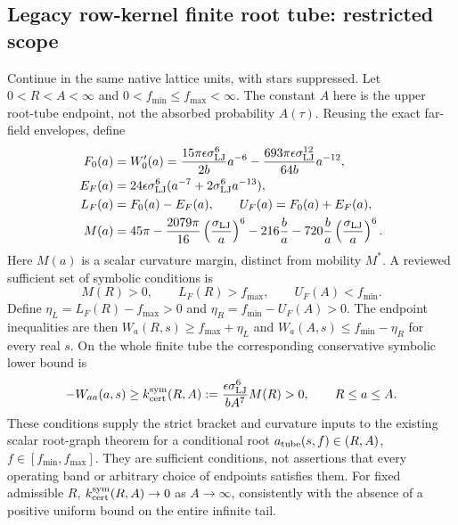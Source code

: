 \documentclass[11pt]{article}
\begin{document}
\subsection{Legacy row-kernel finite root tube: restricted scope}
Continue in the same native lattice units, with stars suppressed.
Let $0<R<A<\infty$ and $0<f_{\min}\leq f_{\max}<\infty$.
The constant $A$ here is the upper root-tube endpoint, not the absorbed
probability $A(\tau)$. Reusing the exact far-field envelopes, define
\begin{align}
 F_0(a)&=W_0'(a)
 =\frac{15\pi\epsilon\sigma_{\rm LJ}^6}{2b}a^{-6}
 -\frac{693\pi\epsilon\sigma_{\rm LJ}^{12}}{64b}a^{-12},\\
 E_F(a)&=24\epsilon\sigma_{\rm LJ}^6
 (a^{-7}+2\sigma_{\rm LJ}^6a^{-13}),\\
 L_F(a)&=F_0(a)-E_F(a),\qquad U_F(a)=F_0(a)+E_F(a),\\
 M(a)&=45\pi-\frac{2079\pi}{16}\left(\frac{\sigma_{\rm LJ}}a\right)^6
 -216\frac ba-720\frac ba\left(\frac{\sigma_{\rm LJ}}a\right)^6 .
\end{align}
Here $M(a)$ is a scalar curvature margin, distinct from mobility $M^*$.
A reviewed sufficient set of symbolic conditions is
\begin{equation}
 M(R)>0,\qquad L_F(R)>f_{\max},\qquad U_F(A)<f_{\min}.
 \label{eq:finite-tube-conditions}
\end{equation}
Define $\eta_L=L_F(R)-f_{\max}>0$ and
$\eta_R=f_{\min}-U_F(A)>0$. The endpoint inequalities are then
$W_a(R,s)\geq f_{\max}+\eta_L$ and
$W_a(A,s)\leq f_{\min}-\eta_R$ for every real $s$.
On the whole finite tube the corresponding conservative symbolic lower bound is
\begin{equation}
 -W_{aa}(a,s)\geq k_{\rm cert}^{\rm sym}(R,A)
 :=\frac{\epsilon\sigma_{\rm LJ}^6}{bA^7}M(R)>0,
 \qquad R\leq a\leq A .
 \label{eq:finite-tube-curvature}
\end{equation}
These conditions supply the strict bracket and curvature inputs to the
existing scalar root-graph theorem for a conditional root
$a_{\rm tube}(s,f)\in(R,A)$, $f\in[f_{\min},f_{\max}]$.
They are sufficient conditions, not assertions that every operating band
or arbitrary choice of endpoints satisfies them.
For fixed admissible $R$, $k_{\rm cert}^{\rm sym}(R,A)\to0$ as
$A\to\infty$, consistently with the absence of a positive uniform bound
on the entire infinite tail.
\end{document}
